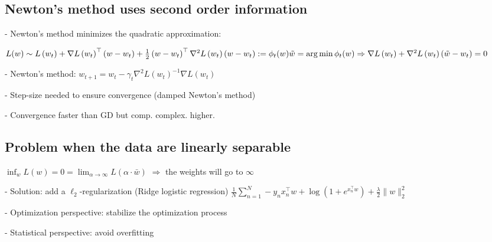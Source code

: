 \subsection*{Newton's method uses second order information}
- Newton's method minimizes the quadratic approximation:

$
L(w) \sim L\left(w_{t}\right)+\nabla L\left(w_{t}\right)^{\top}\left(w-w_{t}\right)+\frac{1}{2}\left(w-w_{t}\right)^{\top} \nabla^{2} L\left(w_{t}\right)\left(w-w_{t}\right) :=\phi_{t}(w) \\
\tilde{w}=\arg \min \phi_{t}(w) \Rightarrow \nabla L\left(w_{t}\right)+\nabla^{2} L\left(w_{t}\right)\left(\tilde{w}-w_{t}\right)=0
$

- Newton's method: $w_{t+1}=w_{t}-\gamma_{t} \nabla^{2} L\left(w_{t}\right)^{-1} \nabla L\left(w_{t}\right)$

- Step-size needed to ensure convergence (damped Newton's method)

- Convergence faster than GD but comp. complex. higher.

\subsection*{Problem when the data are linearly separable}

$
\inf _{w} L(w)=0=\lim _{\alpha \rightarrow \infty} L(\alpha \cdot \bar{w})
$ $\Rightarrow$ the weights will go to $\infty$

- Solution: add a $\ell_{2}$-regularization (Ridge logistic regression)
$\frac{1}{N} \sum_{n=1}^{N}-y_{n} x_{n}^{\top} w+\log \left(1+e^{x_{n}^{\top} w}\right)+\frac{\lambda}{2}\|w\|_{2}^{2}$

- Optimization perspective: stabilize the optimization process

- Statistical perspective: avoid overfitting
